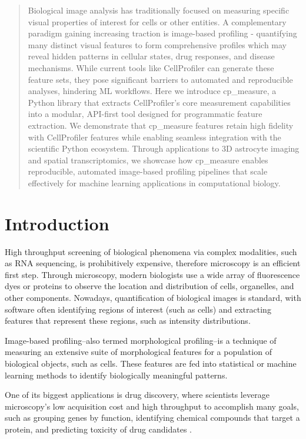 \documentclass{article}
\begin{document}
\begin{abstract}
Biological image analysis has traditionally focused on measuring specific visual properties of interest for cells or other entities. 
A complementary paradigm gaining increasing traction is image-based profiling - quantifying many distinct visual features to form comprehensive profiles which may reveal hidden patterns in cellular states, drug responses, and disease mechanisms.
While current tools like CellProfiler can generate these feature sets, they pose significant barriers to automated and reproducible analyses, hindering ML workflows. Here we introduce cp\_measure, a Python library that extracts CellProfiler's core measurement capabilities into a modular, API-first tool designed for programmatic feature extraction. We demonstrate that cp\_measure features retain high fidelity with CellProfiler features while enabling seamless integration with the scientific Python ecosystem. Through applications to 3D astrocyte imaging and spatial transcriptomics, we showcase how cp\_measure enables reproducible, automated image-based profiling pipelines that scale effectively for machine learning applications in computational biology.
\end{abstract}

\section{Introduction}
\label{sec:org4c9ba67}
High throughput screening of biological phenomena via complex modalities, such as RNA sequencing, is prohibitively expensive, therefore microscopy is an efficient first step. Through microscopy, modern biologists use a wide array of fluorescence dyes or proteins to observe the location and distribution of cells, organelles, and other components. Nowadays, quantification of biological images is standard, with software often identifying regions of interest (such as cells) and extracting features that represent these regions, such as intensity distributions.

Image-based profiling--also termed morphological profiling--is a technique of measuring an extensive suite of morphological features for a population of biological objects, such as cells. 
These features are fed into statistical or machine learning methods to identify biologically meaningful patterns. 

One of its biggest applications is drug discovery, where scientists leverage microscopy's low acquisition cost and high throughput to accomplish many goals, such as grouping genes by function, identifying chemical compounds that target a protein, and predicting toxicity of drug candidates \citep{sealDecadeSystematicReview2024}. 
\end{document}
